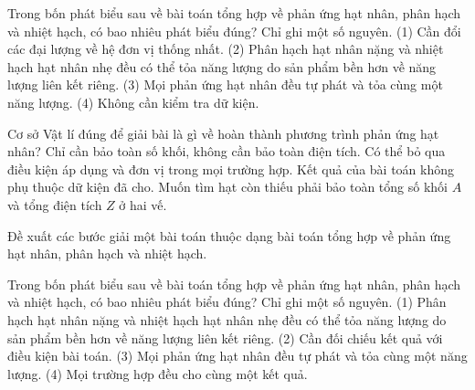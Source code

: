 \begin{ex}
Trong bốn phát biểu sau về bài toán tổng hợp về phản ứng hạt nhân, phân hạch và nhiệt hạch, có bao nhiêu phát biểu đúng? Chỉ ghi một số nguyên. (1) Cần đổi các đại lượng về hệ đơn vị thống nhất. (2) Phân hạch hạt nhân nặng và nhiệt hạch hạt nhân nhẹ đều có thể tỏa năng lượng do sản phẩm bền hơn về năng lượng liên kết riêng. (3) Mọi phản ứng hạt nhân đều tự phát và tỏa cùng một năng lượng. (4) Không cần kiểm tra dữ kiện.
\end{ex}

\begin{ex}
Cơ sở Vật lí đúng để giải bài là gì về hoàn thành phương trình phản ứng hạt nhân?
\choice
{Chỉ cần bảo toàn số khối, không cần bảo toàn điện tích.}
{Có thể bỏ qua điều kiện áp dụng và đơn vị trong mọi trường hợp.}
{Kết quả của bài toán không phụ thuộc dữ kiện đã cho.}
{\True Muốn tìm hạt còn thiếu phải bảo toàn tổng số khối $A$ và tổng điện tích $Z$ ở hai vế.}
\end{ex}

\begin{bt}
Đề xuất các bước giải một bài toán thuộc dạng bài toán tổng hợp về phản ứng hạt nhân, phân hạch và nhiệt hạch.
\end{bt}

\begin{ex}
Trong bốn phát biểu sau về bài toán tổng hợp về phản ứng hạt nhân, phân hạch và nhiệt hạch, có bao nhiêu phát biểu đúng? Chỉ ghi một số nguyên. (1) Phân hạch hạt nhân nặng và nhiệt hạch hạt nhân nhẹ đều có thể tỏa năng lượng do sản phẩm bền hơn về năng lượng liên kết riêng. (2) Cần đối chiếu kết quả với điều kiện bài toán. (3) Mọi phản ứng hạt nhân đều tự phát và tỏa cùng một năng lượng. (4) Mọi trường hợp đều cho cùng một kết quả.
\end{ex}

